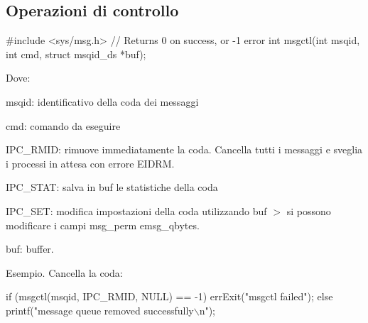 \subsection*{Operazioni di controllo}


\begin{DoxyCode}
\textcolor{preprocessor}{#include <sys/msg.h>}
\textcolor{comment}{// Returns 0 on success, or -1 error}
\textcolor{keywordtype}{int} msgctl(\textcolor{keywordtype}{int} msqid, \textcolor{keywordtype}{int} cmd, \textcolor{keyword}{struct} msqid\_ds *buf);
\end{DoxyCode}


Dove\+:
\begin{DoxyItemize}
\item {\ttfamily msqid}\+: identificativo della coda dei messaggi
\item {\ttfamily cmd}\+: comando da eseguire
\begin{DoxyItemize}
\item {\ttfamily I\+P\+C\+\_\+\+R\+M\+ID}\+: rimuove immediatamente la coda. Cancella tutti i messaggi e sveglia i processi in attesa con errore E\+I\+D\+RM.
\item {\ttfamily I\+P\+C\+\_\+\+S\+T\+AT}\+: salva in {\ttfamily buf} le statistiche della coda
\item {\ttfamily I\+P\+C\+\_\+\+S\+ET}\+: modifica impostazioni della coda utilizzando {\ttfamily buf} $>$ si possono modificare i campi {\ttfamily msg\+\_\+perm} e{\ttfamily msg\+\_\+qbytes}.
\end{DoxyItemize}
\item {\ttfamily buf}\+: buffer.
\end{DoxyItemize}

Esempio. Cancella la coda\+: 
\begin{DoxyCode}
\textcolor{keywordflow}{if} (msgctl(msqid, IPC\_RMID, NULL) == -1)
    errExit(\textcolor{stringliteral}{"msgctl failed"});
\textcolor{keywordflow}{else}
    printf(\textcolor{stringliteral}{"message queue removed successfully\(\backslash\)n"});
\end{DoxyCode}


